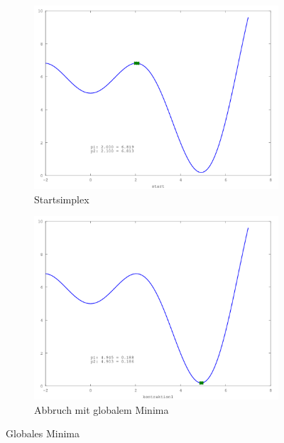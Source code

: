 \begin{figure}[htb]
\centering
\begin{subfigure}[b]{0.49\textwidth}
\centering
\includegraphics[width=\textwidth]{../bilder/GlobMinima/sinx_x001.png}
\caption{Startsimplex}
\end{subfigure} \begin{subfigure}[b]{0.49\textwidth}
\centering
\includegraphics[width=\textwidth]{../bilder/GlobMinima/sinx_x010.png}
\caption{Abbruch mit globalem Minima}
\end{subfigure}
\caption{Globales Minima}
\label{fig:downhillGlobMinima}
\end{figure}


